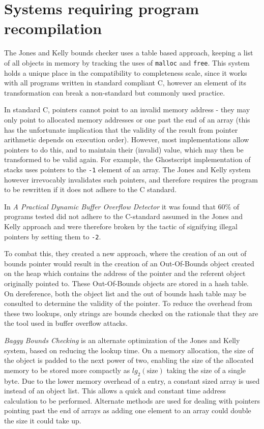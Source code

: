 \section{Systems requiring program recompilation}

The Jones and Kelly bounds checker \cite{jones1997backwards} uses a table based approach, keeping a list of all objects in memory by tracking the uses of \verb!malloc! and \verb!free!.
This system holds a unique place in the compatibility to completeness scale, since it works with all programs written in standard compliant C, however an element of its transformation can break a non-standard but commonly used practice.

In standard C, pointers cannot point to an invalid memory address - they may only point to allocated memory addresses or one past the end of an array (this has the unfortunate implication that the validity of the result from pointer arithmetic depends on execution order).
However, most implementations allow pointers to do this, and to maintain their (invalid) value, which may then be transformed to be valid again.
For example, the Ghostscript implementation of stacks uses pointers to the \verb!-1! element of an array.
The Jones and Kelly system however irrevocably invalidates such pointers, and therefore requires the program to be rewritten if it does not adhere to the C standard.

In \textit{A Practical Dynamic Buffer Overflow Detector} \cite{ruwase2004practical} it was found that 60\% of programs tested did not adhere to the C-standard assumed in the Jones and Kelly approach and were therefore broken by the tactic of signifying illegal pointers by setting them to \verb!-2!.

To combat this, they created a new approach, where the creation of an out of bounds pointer would result in the creation of an Out-Of-Bounds object created on the heap which contains the address of the pointer and the referent object originally pointed to.
These Out-Of-Bounds objects are stored in a hash table.
On dereference, both the object list and the out of bounds hash table may be consulted to determine the validity of the pointer.
To reduce the overhead from these two lookups, only strings are bounds checked on the rationale that they are the tool used in buffer overflow attacks.

\textit{Baggy Bounds Checking} \cite{akritidis2009baggy} is an alternate optimization of the Jones and Kelly system, based on reducing the lookup time.
On a memory allocation, the size of the object is padded to the next power of two, enabling the size of the allocated memory to be stored more compactly as $lg_2(\mbox{size})$ taking the size of a single byte.
Due to the lower memory overhead of a entry, a constant sized array is used instead of an object list.
This allows a quick and constant time address calculation to be performed.
Alternate methods are used for dealing with pointers pointing past the end of arrays as adding one element to an array could double the size it could take up.

